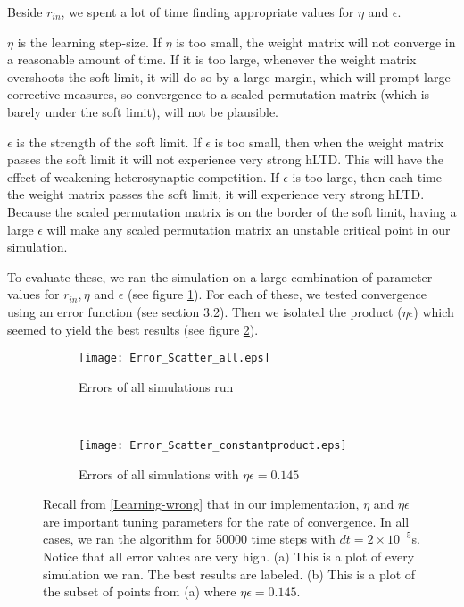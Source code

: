 Beside \(r_{in}\), we spent a lot of time finding appropriate values for \(\eta\) and \(\epsilon\). 

\(\eta\) is the learning step-size. If \(\eta\) is too small, the weight matrix will not converge in a reasonable amount of time. If it is too large, whenever the weight matrix overshoots the soft limit, it will do so by a large margin, which will prompt large corrective measures, so convergence to a scaled permutation matrix (which is barely under the soft limit), will not be plausible.
 
\(\epsilon\) is the strength of the soft limit. If \(\epsilon\) is too small, then when the weight matrix passes the soft limit it will not experience very strong hLTD. This will have the effect of weakening heterosynaptic competition. If \(\epsilon\) is too large, then each time the weight matrix passes the soft limit, it will experience very strong hLTD. Because the scaled permutation matrix is on the border of the soft limit, having a large \(\epsilon\) will make any scaled permutation matrix an unstable critical point in our simulation.

To evaluate these, we ran the simulation on a large combination of parameter values for \(r_{in}, \eta\) and \(\epsilon\) (see figure \ref{Error_scatter: all}). For each of these, we tested convergence using an error function (see section 3.2). Then we isolated the product (\(\eta\epsilon\)) which seemed to yield the best results (see figure \ref{Error_scatter: constant product}).

\begin{figure}[H]
\centering
\begin{subfigure}[b]{0.49\textwidth}
\texttt{[image: Error\_Scatter\_all.eps]}
\caption{Errors of all simulations run}
\label{Error_scatter: all}
\end{subfigure}
\,
\begin{subfigure}[b]{0.49\textwidth}
\texttt{[image: Error\_Scatter\_constantproduct.eps]}
\caption{Errors of all simulations with \(\eta\epsilon = 0.145\)}
\label{Error_scatter: constant product}
\end{subfigure}
\label{Error_scatter}
\caption{Recall from \eqref{Learning-wrong} that in our implementation, \(\eta\) and \(\eta\epsilon\) are important tuning parameters for the rate of convergence. In all cases, we ran the algorithm for 50000 time steps with \(dt = 2\times 10^{-5}\)s. Notice that all error values are very high. (a) This is a plot of every simulation we ran. The best results are labeled. (b) This is a  plot of the subset of points from (a) where \(\eta\epsilon = 0.145\).}
\end{figure}

